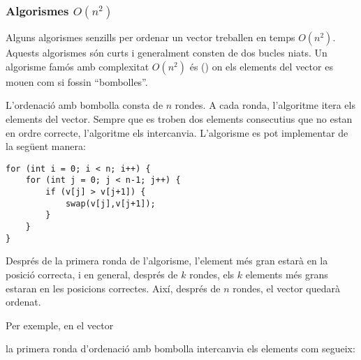 \subsubsection{Algorismes $O(n^2)$}


Alguns algorismes senzills per ordenar un vector
treballen en temps $O(n^2)$.
Aquests algorismes són curts i generalment
consten de dos bucles niats.
Un algorisme famós amb complexitat $O(n^2)$
és  ()
on els elements del vector es mouen
com si fossin ``bombolles''.

L'ordenació amb bombolla consta de $n$ rondes.
A cada ronda, l'algoritme itera
els elements del vector.
Sempre que es troben dos elements consecutius
que no estan en ordre correcte,
l'algoritme els intercanvia.
L'algorisme es pot implementar de la següent manera:
\begin{lstlisting}
for (int i = 0; i < n; i++) {
    for (int j = 0; j < n-1; j++) {
        if (v[j] > v[j+1]) {
            swap(v[j],v[j+1]);
        }
    }
}
\end{lstlisting}

Després de la primera ronda de l'algorisme,
l'element més gran estarà en la posició correcta,
i en general, després de $k$ rondes, els $k$ elements
més grans estaran en les posicions correctes.
Així, després de $n$ rondes, el vector quedarà
ordenat.

Per exemple, en el vector

\begin{center}
\end{center}

\noindent
la primera ronda d'ordenació amb bombolla intercanvia els
elements com segueix:

\begin{center}
\end{center}


